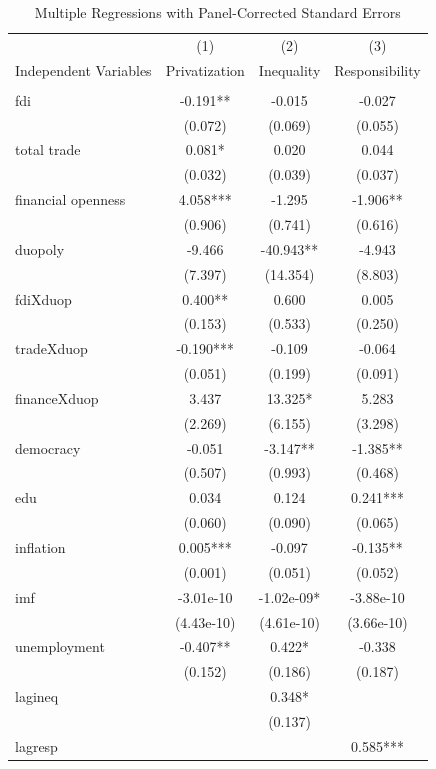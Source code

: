 \documentclass[12pt]{report}
\begin{document}
\begin{center}
\begin{table}
\caption{Multiple Regressions with Panel-Corrected Standard Errors}
\vspace{2em}
{\scriptsize
\begin{tabular}{lccc}\hline
 & (1) & (2) & (3) \\
Independent Variables & Privatization & Inequality & Responsibility \\ \hline
 &  &  &  \\
fdi & -0.191** & -0.015 & -0.027 \\
 & (0.072) & (0.069) & (0.055) \\
total trade & 0.081* & 0.020 & 0.044 \\
 & (0.032) & (0.039) & (0.037) \\
financial openness & 4.058*** & -1.295 & -1.906** \\
 & (0.906) & (0.741) & (0.616) \\
duopoly & -9.466 & -40.943** & -4.943 \\
 & (7.397) & (14.354) & (8.803) \\
fdiXduop & 0.400** & 0.600 & 0.005 \\
 & (0.153) & (0.533) & (0.250) \\
tradeXduop & -0.190*** & -0.109 & -0.064 \\
 & (0.051) & (0.199) & (0.091) \\
financeXduop & 3.437 & 13.325* & 5.283 \\
 & (2.269) & (6.155) & (3.298) \\
democracy & -0.051 & -3.147** & -1.385** \\
 & (0.507) & (0.993) & (0.468) \\
edu & 0.034 & 0.124 & 0.241*** \\
 & (0.060) & (0.090) & (0.065) \\
inflation & 0.005*** & -0.097 & -0.135** \\
 & (0.001) & (0.051) & (0.052) \\
imf & -3.01e-10 & -1.02e-09* & -3.88e-10 \\
 & (4.43e-10) & (4.61e-10) & (3.66e-10) \\
unemployment & -0.407** & 0.422* & -0.338 \\
 & (0.152) & (0.186) & (0.187) \\
lagineq &  & 0.348* &  \\
 &  & (0.137) &  \\
lagresp &  &  & 0.585*** \\

\end{tabular}}
\end{table}
\end{center}
\end{document}
